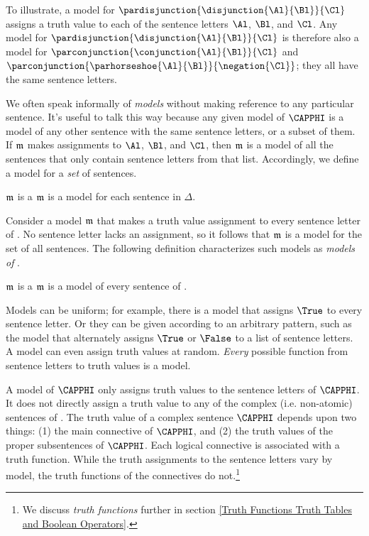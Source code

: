 To illustrate, a model for $\pardisjunction{\disjunction{\Al}{\Bl}}{\Cl}$ assigns a truth value to each of the sentence letters $\Al$, $\Bl$, and $\Cl$.
Any model for $\pardisjunction{\disjunction{\Al}{\Bl}}{\Cl}$ is therefore also a model for $\parconjunction{\conjunction{\Al}{\Bl}}{\Cl}$ and $\parconjunction{\parhorseshoe{\Al}{\Bl}}{\negation{\Cl}}$; they all have the same sentence letters.

We often speak informally of \emph{models} without making reference to any particular \GSL{} sentence.  It's useful to talk this way because any given model of $\CAPPHI$ is a model of any other \GSL{} sentence with the same sentence letters, or a subset of them.  If $\mathfrak{m}$ makes assignments to $\Al$, $\Bl$, and $\Cl$, then $\mathfrak{m}$ is a model of all the sentences that only contain sentence letters from that list.  Accordingly, we define a model for a \emph{set} of \GSL{} sentences.

\begin{majorILnc}{}
	$\mathfrak{m}$ is a  \Iff $\mathfrak{m}$ is a model for each sentence in $\Delta$.
\end{majorILnc}

Consider a model $\mathfrak{m}$ that makes a truth value assignment to every sentence letter of \GSL{}.  No sentence letter lacks an assignment, so it follows that $\mathfrak{m}$ is a model for the set of all \GSL{} sentences.  The following definition characterizes such models as \emph{models of \GSL{}}.

\begin{majorILnc}{}
	$\mathfrak{m}$ is a  \Iff $\mathfrak{m}$ is a model of every sentence of \GSL{}.
\end{majorILnc}

Models can be uniform; for example, there is a model that assigns $\True$ to every sentence letter.
Or they can be given according to an arbitrary pattern, such as the model that alternately assigns $\True$ or $\False$ to a list of sentence letters.
A model can even assign truth values at random. 
\emph{Every} possible function from sentence letters to truth values is a model.

A model of $\CAPPHI$ only assigns truth values to the sentence letters of $\CAPPHI$.
It does not directly assign a truth value to any of the complex (i.e. non-atomic) sentences of \GSL{}.
The truth value of a complex sentence $\CAPPHI$ depends upon two things: (1) the main connective of $\CAPPHI$, and (2) the truth values of the proper subsentences of $\CAPPHI$.
Each logical connective is associated with a truth function.
While the truth assignments to the sentence letters vary by model, the truth functions of the connectives do not.\footnote{We discuss \emph{truth functions} further in section \ref{Truth Functions Truth Tables and Boolean Operators}.}

